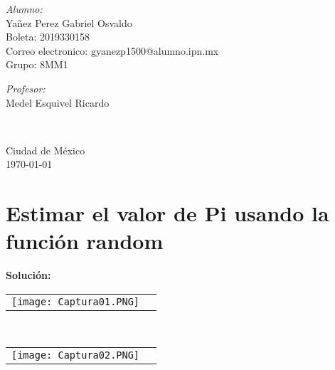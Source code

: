 \documentclass[10pt]{article}\usepackage[]{graphicx}\usepackage[]{color}
\begin{document}
\begin{center}
\begin{minipage}{0.46\textwidth}
\begin{flushleft}
\emph{Alumno:}\\	
Yañez Perez Gabriel Osvaldo\\
Boleta: 2019330158\\
Correo electronico: gyanezp1500@alumno.ipn.mx\\
Grupo: 8MM1
\end{flushleft}																		%
\end{minipage}		
\begin{minipage}{0.52\textwidth}		
\vspace{-0.6cm}											%
\begin{flushright} \large															%
\emph{Profesor:} \\																	%
Medel Esquivel Ricardo\\
\end{flushright}																	%
\end{minipage}	
\vspace*{1cm}
 	
 		\\																		%
\vspace{2cm} 																				
\begin{center}	
Ciudad de México  \\
{\large \today}																	%
 			\end{center}												  						
\end{center}							 											
																					
\newpage																			

\tableofcontents 
\newpage

\section{Estimar el valor de Pi usando la función random}
\textbf{Solución:}\\


\begin{tabular}{p{} p{} }
\texttt{[image: Captura01.PNG]}
\end{tabular}\\
\begin{tabular}{p{} p{} }
\texttt{[image: Captura02.PNG]}
\end{tabular}\\
\end{document}
